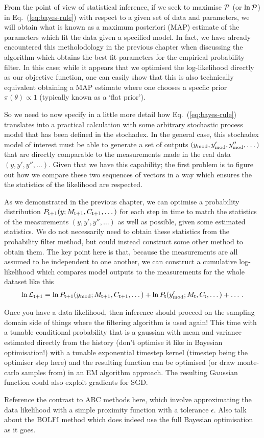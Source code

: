From the point of view of statistical inference, if we seek to maximise ${\cal P}$ (or $\ln {\cal P}$) in Eq.~(\ref{eq:bayes-rule}) with respect to a given set of data and parameters, we will obtain what is known as a maximum posteriori (MAP) estimate of the parameters which fit the data given a specified model. In fact, we have already encountered this metholodology in the previous chapter when discussing the algorithm which obtains the best fit parameters for the empirical probability filter. In this case; while it appears that we optimised the log-likelihood directly as our objective function, one can easily show that this is also technically equivalent obtaining a MAP estimate where one chooses a specfic prior $\pi (\theta ) \propto 1$ (typically known as a `flat prior').

So we need to now specify in a little more detail how Eq.~(\ref{eq:bayes-rule}) translates into a practical calculation with some arbitrary stochastic process model that has been defined in the stochadex. In the general case, this stochadex model of interest must be able to generate a set of outputs $(y_{\rm mod}, y'_{\rm mod}, y''_{\rm mod}, \dots)$ that are directly comparable to the measurements made in the real data $(y, y', y'', \dots)$. Given that we have this capability; the first problem is to figure out how we compare these two sequences of vectors in a way which ensures the the statistics of the likelihood are respected. 

As we demonstrated in the previous chapter, we can optimise a probability distribution $P_{{\sf t}+1}(y;M_{{\sf t}+1},C_{{\sf t}+1},\dots )$ for each step in time to match the statistics of the measurements $(y, y', y'', \dots)$ as well as possible, given some estimated statistics. We do not necessarily need to obtain these statistics from the probability filter method, but could instead construct some other method to obtain them. The key point here is that, because the measurements are all assumed to be independent to one another, we can construct a cumulative log-likelihood which compares model outputs to the measurements for the whole dataset like this
\begin{align}
\ln {\cal L}_{{\sf t}+1} = \ln P_{{\sf t}+1}(y_{\rm mod};M_{{\sf t}+1},C_{{\sf t}+1},\dots ) + \ln P_{{\sf t}}(y'_{\rm mod};M_{{\sf t}},C_{{\sf t}},\dots ) + \dots \,.
\end{align}

Once you have a data likelihood, then inference should proceed on the sampling domain side of things where the filtering algorithm is used again! This time with a tunable conditional probability that is a gaussian with mean and variance estimated directly from the history (don't optimise it like in Bayesian optimisation!) with a tunable exponential timestep kernel (timestep being the optimiser step here) and the resulting function can be optimised (or draw monte-carlo samples from) in an EM algorithm approach. The resulting Gaussian function could also exploit gradients for SGD.

Reference the contrast to ABC methods here, which involve approximating the data likelihood with a simple proximity function with a tolerance $\epsilon$. Also talk about the BOLFI method which does indeed use the full Bayesian optimisation as it goes.

